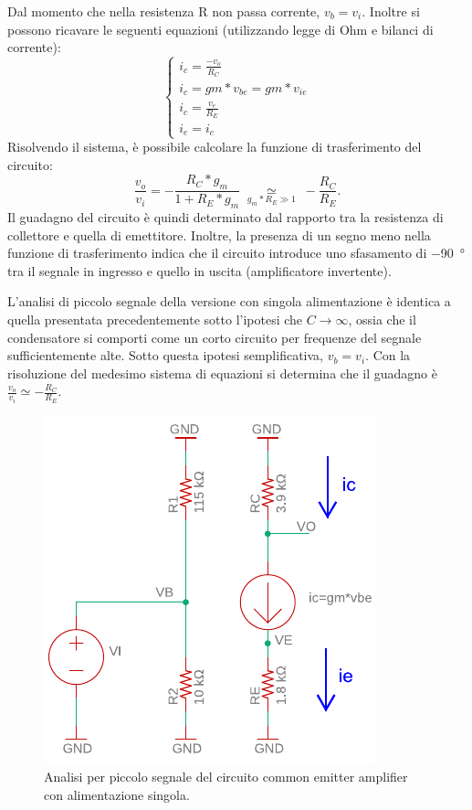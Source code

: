 Dal momento che nella resistenza R non passa corrente, $v_b=v_i$. Inoltre si possono ricavare le seguenti equazioni (utilizzando legge di Ohm e bilanci di corrente):
\begin{equation}
	\begin{cases}
		i_c=\frac{-v_o}{R_C} \\
		i_c=gm*v_{be}=gm*v_{ie} \\
		i_c=\frac{v_e}{R_E} \\
		i_e=i_c
	\end{cases}
\end{equation}
Risolvendo il sistema, è possibile calcolare la funzione di trasferimento del circuito:
\begin{equation}
	\frac{v_o}{v_i}=-\frac{R_C*g_m}{1+R_E*g_m}\;\underset{g_m*R_E\gg 1}{\simeq}\;-\frac{R_C}{R_E}.
\end{equation}
Il guadagno del circuito è quindi determinato dal rapporto tra la resistenza di collettore e quella di emettitore. Inoltre, la presenza di un segno meno nella funzione di trasferimento indica che il circuito introduce uno sfasamento di \SI{-90}{\degree} tra il segnale in ingresso e quello in uscita (amplificatore invertente). 

L'analisi di piccolo segnale della versione con singola alimentazione è identica a quella presentata precedentemente sotto l'ipotesi che $C\to\infty$, ossia che il condensatore si comporti come un corto circuito per frequenze del segnale sufficientemente alte. Sotto questa ipotesi semplificativa, $v_b=v_i$. Con la risoluzione del medesimo sistema di equazioni si determina che il guadagno è $\frac{v_o}{v_i}\simeq-\frac{R_C}{R_E}.$
\begin{figure}[h!]
	\centering
	\includegraphics[width=0.4\linewidth]{./OtherFiles/Laboratorio 3/common emitter_se-piccolo segnale-printout}
	\caption{Analisi per piccolo segnale del circuito common emitter amplifier con alimentazione singola.}
	\label{fig:commonemitter_se_AC}
\end{figure}

